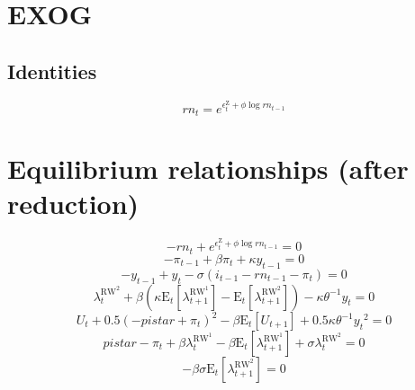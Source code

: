\section{EXOG}

\subsection{Identities}

\begin{equation}
{r\!n}_{t} = e^{\epsilon^{\mathrm{Z}}_{t} + {\phi} {\log{{r\!n}_{t-1}}}}
\end{equation}




\section{Equilibrium relationships (after reduction)}

\begin{equation}
-{r\!n}_{t} + e^{\epsilon^{\mathrm{Z}}_{t} + {\phi} {\log{{r\!n}_{t-1}}}} = 0
\end{equation}
\begin{equation}
-\pi_{t-1} + {\beta} {\pi_{t}} + {\kappa} {y_{t-1}} = 0
\end{equation}
\begin{equation}
-y_{t-1} + y_{t} - {\sigma} \left(i_{t-1} - {r\!n}_{t-1} - \pi_{t}\right) = 0
\end{equation}
\begin{equation}
\lambda^{\mathrm{RW}^{\mathrm{2}}}_{t} + {\beta} \left({\kappa} {\mathrm{E}_{t}\left[\lambda^{\mathrm{RW}^{\mathrm{1}}}_{t+1}\right]} - \mathrm{E}_{t}\left[\lambda^{\mathrm{RW}^{\mathrm{2}}}_{t+1}\right]\right) - {\kappa} {\theta}^{-1} {y_{t}} = 0
\end{equation}
\begin{equation}
U_{t} + 0.5\left(-{p\!i\!s\!t\!a\!r} + \pi_{t}\right)^{2} - {\beta} {\mathrm{E}_{t}\left[U_{t+1}\right]} + 0.5{\kappa} {\theta}^{-1} {y_{t}}^{2} = 0
\end{equation}
\begin{equation}
{p\!i\!s\!t\!a\!r} - \pi_{t} + {\beta} {\lambda^{\mathrm{RW}^{\mathrm{1}}}_{t}} - {\beta} {\mathrm{E}_{t}\left[\lambda^{\mathrm{RW}^{\mathrm{1}}}_{t+1}\right]} + {\sigma} {\lambda^{\mathrm{RW}^{\mathrm{2}}}_{t}} = 0
\end{equation}
\begin{equation}
-{\beta} {\sigma} {\mathrm{E}_{t}\left[\lambda^{\mathrm{RW}^{\mathrm{2}}}_{t+1}\right]} = 0
\end{equation}



